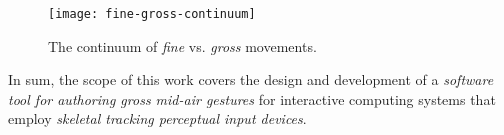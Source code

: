 \begin{SCfigure}[\sidecaptionrelwidth][ht]
\centering
\texttt{[image: fine-gross-continuum]}
\caption{The continuum of \emph{fine} vs. \emph{gross} movements.}
\label{fig:fine-gross-continuum}
\end{SCfigure}

In sum, the scope of this work covers the design and development of a \emph{software tool for authoring gross mid-air gestures} for interactive computing systems that employ \emph{skeletal tracking perceptual input devices}.
